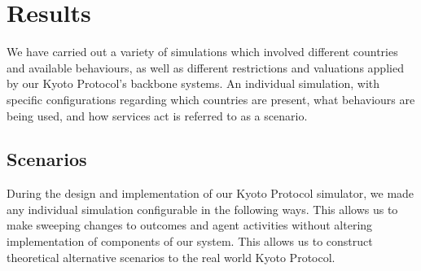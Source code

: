 \section{Results}

We have carried out a variety of simulations which involved different countries and available behaviours, as well as different restrictions and valuations applied by our Kyoto Protocol's backbone systems. An individual simulation, with specific configurations regarding which countries are present, what behaviours are being used, and how services act is referred to as a scenario.

\subsection{Scenarios}

During the design and implementation of our Kyoto Protocol simulator, we made any individual simulation configurable in the following ways. This allows us to make sweeping changes to outcomes and agent activities without altering implementation of components of our system. This allows us to construct theoretical alternative scenarios to the real world Kyoto Protocol.

